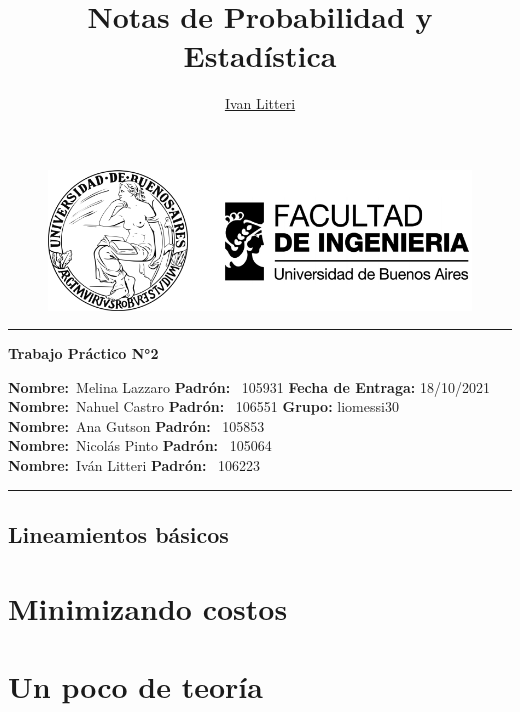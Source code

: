 \documentclass[hidelinks]{report}
\title{Notas de Probabilidad y Estadística}
\author{\href{https://github.com/ilitteri}{Ivan Litteri}}
\date{}
\begin{document}
	
\begin{figure}
	\centering
	\includegraphics{../assets/banner_fiuba.pdf}
\end{figure}

\begin{center}
	\hrule
	\vspace{.4cm}
	{\textbf { \large Trabajo Práctico N°2}}
\end{center}
{\textbf{Nombre:}\ Melina Lazzaro \textbf{Padrón:}} \ 105931 \hspace{\fill} \textbf{Fecha de Entraga:} 18/10/2021   \\
{\textbf{Nombre:}\ Nahuel Castro \textbf{Padrón:}} \ 106551 \hspace{\fill} \textbf{Grupo:} liomessi30   \\
{\textbf{Nombre:}\ Ana Gutson  \textbf{Padrón:}} \ 105853 \hspace{\fill}    \\
{\textbf{Nombre:}\ Nicolás Pinto  \textbf{Padrón:}} \ 105064 \hspace{\fill}    \\
{\textbf{Nombre:}\ Iván Litteri  \textbf{Padrón:}} \ 106223 \hspace{\fill}    \\
	\hrule

\section*{Lineamientos básicos}


\tableofcontents
\clearpage

\chapter{Minimizando costos}

\clearpage

\chapter{Un poco de teoría}

\clearpage
\end{document}
